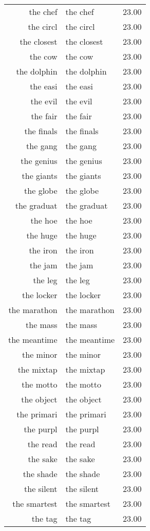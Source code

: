\begin{table}[ht]
\begin{tabular}{rlr}
  the chef & the chef & 23.00 \\ 
  the circl & the circl & 23.00 \\ 
  the closest & the closest & 23.00 \\ 
  the cow & the cow & 23.00 \\ 
  the dolphin & the dolphin & 23.00 \\ 
  the easi & the easi & 23.00 \\ 
  the evil & the evil & 23.00 \\ 
  the fair & the fair & 23.00 \\ 
  the finals & the finals & 23.00 \\ 
  the gang & the gang & 23.00 \\ 
  the genius & the genius & 23.00 \\ 
  the giants & the giants & 23.00 \\ 
  the globe & the globe & 23.00 \\ 
  the graduat & the graduat & 23.00 \\ 
  the hoe & the hoe & 23.00 \\ 
  the huge & the huge & 23.00 \\ 
  the iron & the iron & 23.00 \\ 
  the jam & the jam & 23.00 \\ 
  the leg & the leg & 23.00 \\ 
  the locker & the locker & 23.00 \\ 
  the marathon & the marathon & 23.00 \\ 
  the mass & the mass & 23.00 \\ 
  the meantime & the meantime & 23.00 \\ 
  the minor & the minor & 23.00 \\ 
  the mixtap & the mixtap & 23.00 \\ 
  the motto & the motto & 23.00 \\ 
  the object & the object & 23.00 \\ 
  the primari & the primari & 23.00 \\ 
  the purpl & the purpl & 23.00 \\ 
  the read & the read & 23.00 \\ 
  the sake & the sake & 23.00 \\ 
  the shade & the shade & 23.00 \\ 
  the silent & the silent & 23.00 \\ 
  the smartest & the smartest & 23.00 \\ 
  the tag & the tag & 23.00 \\ 

\end{tabular}
\end{table}
